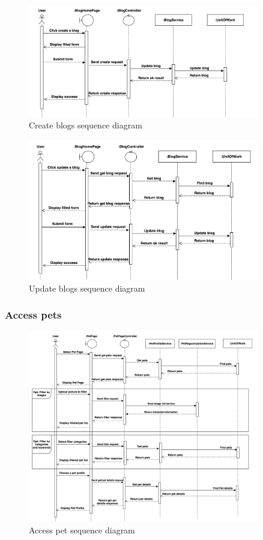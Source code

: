 \begin{figure}[H]
    \centering
    \includegraphics[width=0.9\textwidth]{Figures/manage_blog_seq.png}
    \caption{Create blogs sequence diagram}
    \label{fig:manage-blog-seq}
\end{figure}

\begin{figure}[H]
    \centering
    \includegraphics[width=0.9\textwidth]{Figures/update_blog_seq.png}
    \caption{Update blogs sequence diagram}
    \label{fig:update-blog-seq}
\end{figure}
\clearpage

\subsubsection*{Access pets}
\begin{figure}[H]
    \centering
    \includegraphics[width=0.9\textwidth]{Figures/access_pet_seq.png}
    \caption{Access pet sequence diagram}
    \label{fig:access-pet-seq}
\end{figure}

